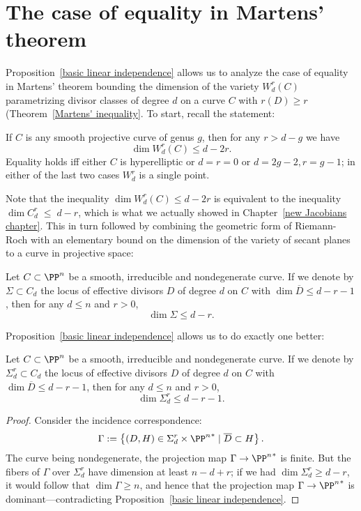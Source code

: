 \section{The case of equality in Martens' theorem}

Proposition~\ref{basic linear independence}  allows us to analyze the case of equality in Martens' theorem bounding the dimension of the variety $W^r_d(C)$ parametrizing divisor classes of degree $d$ on a curve $C$ with $r(D) \geq r$
(Theorem~\ref{Martens' inequality}.
To start, recall the statement:

\begin{theorem}\label{full Martens}
If $C$ is any smooth projective curve of genus $g$, then for any $r>d-g$ we have
$$
\dim W^r_d(C) \leq d-2r.
$$
Equality holds iff either $C$ is hyperelliptic
or $d=r=0$ or $d=2g-2, r=g-1$; in either of the last two cases $W^r_d$ is
a single point.
\end{theorem}

Note that the inequality $\dim W^r_d(C) \leq d-2r$ is equivalent to the inequality $\dim C^r_d \; \leq \; d-r$, which is what we actually showed in Chapter~\ref{new Jacobians chapter}. This in turn followed by combining the geometric form of Riemann-Roch with an elementary bound on the dimension of the variety of secant planes to a curve in projective space:

\begin{lemma}
Let $C \subset \PP^n$ be a smooth, irreducible and nondegenerate curve. If we denote by $\Sigma \subset C_d$ the locus of effective divisors $D$ of degree $d$ on $C$ with $\dim \overline D \leq d-r-1$, then for any $d \leq n$ and $r > 0$,
$$
\dim \Sigma \leq d-r.
$$
\end{lemma}

Proposition~\ref{basic linear independence} allows us to do exactly one better: 

\begin{lemma}\label{Strong secant plane lemma}
Let $C \subset \PP^n$ be a smooth, irreducible and nondegenerate curve. If we denote by $\Sigma^r_d \subset C_d$ the locus of effective divisors $D$ of degree $d$ on $C$ with $\dim \overline D \leq d-r-1$, then for any $d \leq n$ and $r > 0$,
$$
\dim \Sigma^r_d \leq d-r-1.
$$
\end{lemma}

\begin{proof}
Consider the incidence correspondence: 
$$
\Gamma := \left\{ (D, H) \in \Sigma^r_d\times {\PP^n}^* \mid \overline D \subset H \right\}.
$$
The curve being nondegenerate, the projection map $\Gamma \to  {\PP^n}^*$ is finite. But the fibers of $\Gamma$ over $\Sigma^r_d$ have dimension at least $n-d+r$; if we had $\dim \Sigma^r_d \geq d-r$, it would follow that $\dim \Gamma \geq n$, and hence that the projection map $\Gamma \to  {\PP^n}^*$ is dominant---contradicting Proposition~\ref{basic linear independence}.
\end{proof}

